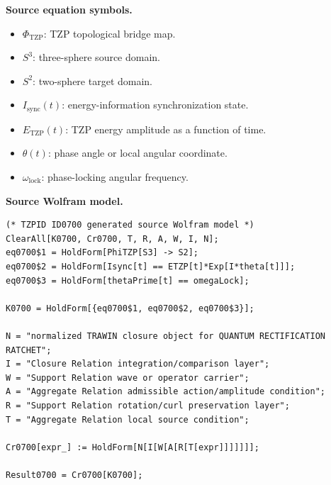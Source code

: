 \begin{minipage}[t]{0.49\linewidth}
\begingroup
\small
\raggedright
\textbf{Source equation symbols.}\par
\begin{itemize}[leftmargin=1.35em,itemsep=1pt,topsep=1pt,parsep=0pt]
    \item $\Phi_{\mathrm{TZP}}$: TZP topological bridge map.
    \item $S^3$: three-sphere source domain.
    \item $S^2$: two-sphere target domain.
    \item $I_{\mathrm{sync}}(t)$: energy-information synchronization state.
    \item $E_{\mathrm{TZP}}(t)$: TZP energy amplitude as a function of time.
    \item $\theta(t)$: phase angle or local angular coordinate.
    \item $\omega_{\mathrm{lock}}$: phase-locking angular frequency.
\end{itemize}
\endgroup
\end{minipage}\hfill
\begin{minipage}[t]{0.47\linewidth}
\begingroup
\scriptsize
\raggedright
\textbf{Source Wolfram model.}\par
\begin{Verbatim}[fontsize=\tiny,breaklines=true,breakanywhere=true]
(* TZPID ID0700 generated source Wolfram model *)
ClearAll[K0700, Cr0700, T, R, A, W, I, N];
eq0700$1 = HoldForm[PhiTZP[S3] -> S2];
eq0700$2 = HoldForm[Isync[t] == ETZP[t]*Exp[I*theta[t]]];
eq0700$3 = HoldForm[thetaPrime[t] == omegaLock];

K0700 = HoldForm[{eq0700$1, eq0700$2, eq0700$3}];

N = "normalized TRAWIN closure object for QUANTUM RECTIFICATION RATCHET";
I = "Closure Relation integration/comparison layer";
W = "Support Relation wave or operator carrier";
A = "Aggregate Relation admissible action/amplitude condition";
R = "Support Relation rotation/curl preservation layer";
T = "Aggregate Relation local source condition";

Cr0700[expr_] := HoldForm[N[I[W[A[R[T[expr]]]]]]];

Result0700 = Cr0700[K0700];
\end{Verbatim}
\endgroup
\end{minipage}

